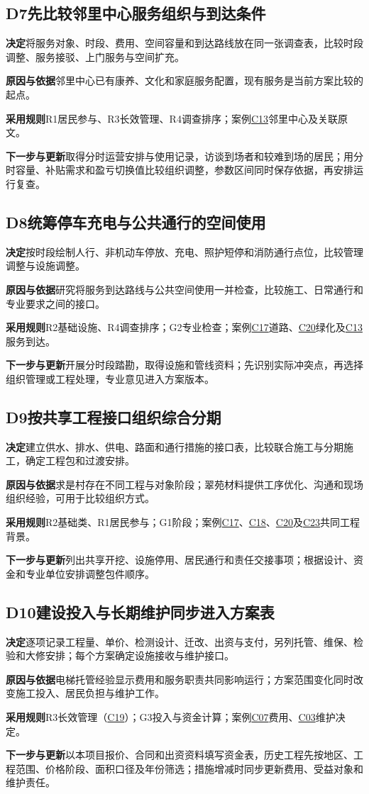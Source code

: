 \documentclass[UTF8,11pt,fontset=windows]{ctexart}
\newcommand{\field}[2]{\par\noindent\textbf{#1}\quad #2\par}
\newcommand{\decision}[2]{\Needspace{7\baselineskip}\subsection*{#1\quad #2}}
\begin{document}
\decision{D7}{先比较邻里中心服务组织与到达条件}
\field{决定}{将服务对象、时段、费用、空间容量和到达路线放在同一张调查表，比较时段调整、服务接驳、上门服务与空间扩充。}
\field{原因与依据}{邻里中心已有康养、文化和家庭服务配置，现有服务是当前方案比较的起点。\cite{neighbor}}
\field{采用规则}{R1居民参与、R3长效管理、R4调查排序；案例\hyperlink{EXP-8ab942a8-bdac-4075-97da-46b09ee9aa41}{C13}邻里中心及关联原文。}
\field{下一步与更新}{取得分时运营安排与使用记录，访谈到场者和较难到场的居民；用分时容量、补贴需求和盈亏切换值比较组织调整，参数区间同时保存依据，再安排运行复查。}

\decision{D8}{统筹停车充电与公共通行的空间使用}
\field{决定}{按时段绘制人行、非机动车停放、充电、照护短停和消防通行点位，比较管理调整与设施调整。}
\field{原因与依据}{研究将服务到达路线与公共空间使用一并检查，比较施工、日常通行和专业要求之间的接口。\cite{policy,neighbor}}
\field{采用规则}{R2基础设施、R4调查排序；G2专业检查；案例\hyperlink{EXP-4fb5ae8b-4f8c-4b38-9f15-7fd612098a66}{C17}道路、\hyperlink{EXP-825f931a-a8d3-49c2-9c42-e73bea9922e6}{C20}绿化及\hyperlink{EXP-8ab942a8-bdac-4075-97da-46b09ee9aa41}{C13}服务到达。}
\field{下一步与更新}{开展分时段踏勘，取得设施和管线资料；先识别实际冲突点，再选择组织管理或工程处理，专业意见进入方案版本。}

\decision{D9}{按共享工程接口组织综合分期}
\field{决定}{建立供水、排水、供电、路面和通行措施的接口表，比较联合施工与分期施工，确定工程包和过渡安排。}
\field{原因与依据}{求是村存在不同工程与对象阶段；翠苑材料提供工序优化、沟通和现场组织经验，可用于比较组织方式。\cite{water,cuiyuan}}
\field{采用规则}{R2基础类、R1居民参与；G1阶段；案例\hyperlink{EXP-4fb5ae8b-4f8c-4b38-9f15-7fd612098a66}{C17}、\hyperlink{EXP-54fdb799-7504-45fd-bd7a-b619e98cf6cb}{C18}、\hyperlink{EXP-825f931a-a8d3-49c2-9c42-e73bea9922e6}{C20}及\hyperlink{EXP-1d56715f-f6b6-4e9f-8298-5ce656ee40c5}{C23}共同工程背景。}
\field{下一步与更新}{列出共享开挖、设施停用、居民通行和责任交接事项；根据设计、资金和专业单位安排调整包件顺序。}

\decision{D10}{建设投入与长期维护同步进入方案表}
\field{决定}{逐项记录工程量、单价、检测设计、迁改、出资与支付，另列托管、维保、检验和大修安排；每个方案确定设施接收与维护接口。}
\field{原因与依据}{电梯托管经验显示费用和服务职责共同影响运行；方案范围变化同时改变施工投入、居民负担与维护工作。\cite{trust}}
\field{采用规则}{R3长效管理（\hyperlink{EXP-6baff473-93ed-4160-9a93-a0abf3c7b092}{C19}）；G3投入与资金计算；案例\hyperlink{EXP-3092f687-50c6-452e-b1d1-5703c250c25e}{C07}费用、\hyperlink{EXP-1f50f306-64e5-4335-be56-5c89531c00f2}{C03}维护决定。}
\field{下一步与更新}{以本项目报价、合同和出资资料填写资金表，历史工程先按地区、工程范围、价格阶段、面积口径及年份筛选；措施增减时同步更新费用、受益对象和维护责任。}
\end{document}
